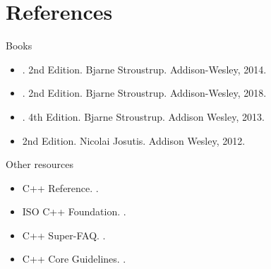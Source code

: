 \section{References}

\begin{frame}[t]{Books}
\begin{itemize}
  \item {}.
        2nd Edition.
        Bjarne Stroustrup.
        Addison-Wesley, 2014.

  \vfill
  \item {}.
        2nd Edition.
        Bjarne Stroustrup.
        Addison-Wesley, 2018.

  \vfill
  \item {}.
        4th Edition.
        Bjarne Stroustrup.
        Addison Wesley, 2013.

  \vfill
  \item {}
        2nd Edition.
        Nicolai Josutis.
        Addison Wesley, 2012.
\end{itemize}
\end{frame}

\begin{frame}[t]{Other resources}
\begin{itemize}
  \item C++ Reference.
        .

  \vfill
  \item ISO C++ Foundation.
        .

  \vfill
  \item C++ Super-FAQ.
        .

  \vfill
  \item C++ Core Guidelines.
        .
\end{itemize}
\end{frame}
